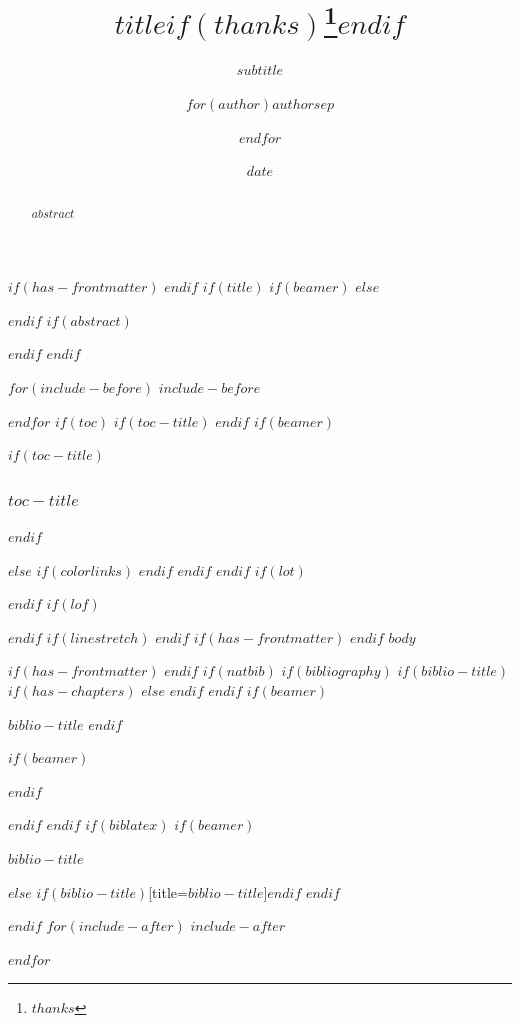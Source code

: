 \documentclass[
$if(fontsize)$
  $fontsize$,
$endif$
$if(lang)$
  $babel-lang$,
$endif$
$if(papersize)$
  $papersize$paper,
$endif$
$if(beamer)$
  ignorenonframetext,
$if(handout)$
  handout,
$endif$
$if(aspectratio)$
  aspectratio=$aspectratio$,
$endif$
$endif$
$for(classoption)$
  $classoption$$sep$,
$endfor$
]{$documentclass$}
\title{$title$$if(thanks)$\thanks{$thanks$}$endif$}
\subtitle{$subtitle$}
\author{$for(author)$$author$$sep$ \and $endfor$}
\date{$date$}
\institute{$for(institute)$$institute$$sep$ \and $endfor$}
\newif\ifbibliography
\begin{document}
$if(has-frontmatter)$
\frontmatter
$endif$
$if(title)$
$if(beamer)$
\frame{\titlepage}
$else$
\maketitle
$endif$
$if(abstract)$
\begin{abstract}
$abstract$
\end{abstract}
$endif$
$endif$

$for(include-before)$
$include-before$

$endfor$
$if(toc)$
\clearpage
$if(toc-title)$
\renewcommand*\contentsname{$toc-title$}
$endif$
$if(beamer)$
\begin{frame}[allowframebreaks]
$if(toc-title)$
  \frametitle{$toc-title$}
$endif$
  \tableofcontents[hideallsubsections]
\end{frame}
$else$
{
$if(colorlinks)$
\hypersetup{linkcolor=$if(toccolor)$$toccolor$$else$$endif$}
$endif$
\setcounter{tocdepth}{$toc-depth$}
\tableofcontents
}
\clearpage
$endif$
$endif$
$if(lot)$
\listoftables
$endif$
$if(lof)$
\listoffigures
$endif$
$if(linestretch)$
$endif$
$if(has-frontmatter)$
\mainmatter
$endif$
$body$

$if(has-frontmatter)$
\backmatter
$endif$
$if(natbib)$
$if(bibliography)$
$if(biblio-title)$
$if(has-chapters)$
\renewcommand\bibname{$biblio-title$}
$else$
\renewcommand\refname{$biblio-title$}
$endif$
$endif$
$if(beamer)$
\begin{frame}[allowframebreaks]{$biblio-title$}
  \bibliographytrue
$endif$
  
$if(beamer)$
\end{frame}
$endif$

$endif$
$endif$
$if(biblatex)$
$if(beamer)$
\begin{frame}[allowframebreaks]{$biblio-title$}
  \bibliographytrue
  \printbibliography[heading=none]
\end{frame}
$else$
\printbibliography$if(biblio-title)$[title=$biblio-title$]$endif$
$endif$

$endif$
$for(include-after)$
$include-after$

$endfor$
\end{document}
